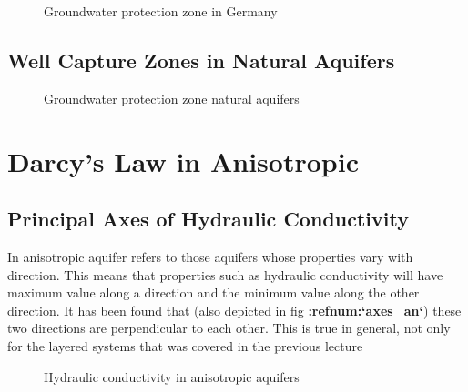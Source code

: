 \documentclass[letterpaper,10pt,english]{jupyterBook}
\begin{document}
\begin{figure}[htbp]
\centering
\capstart

\noindent{}
\caption{Groundwater protection zone in Germany}\label{\detokenize{content/flow/L6/16_darcy_law_3D:pzones-de}}\end{figure}


\subsection{Well Capture Zones in Natural Aquifers}
\label{\detokenize{content/flow/L6/16_darcy_law_3D:well-capture-zones-in-natural-aquifers}}
\begin{figure}[htbp]
\centering
\capstart

\noindent{}
\caption{Groundwater protection zone natural aquifers}\label{\detokenize{content/flow/L6/16_darcy_law_3D:pzones-nat}}\end{figure}


\section{Darcy’s Law in Anisotropic}
\label{\detokenize{content/flow/L6/16_darcy_law_3D:darcy-s-law-in-anisotropic}}

\subsection{Principal Axes of Hydraulic Conductivity}
\label{\detokenize{content/flow/L6/16_darcy_law_3D:principal-axes-of-hydraulic-conductivity}}
\sphinxAtStartPar
In anisotropic aquifer refers to those aquifers whose properties vary with direction. This means that properties such as hydraulic conductivity will have maximum value along a direction and the minimum value along the other direction. It has been found that (also depicted in fig {\color{red}\bfseries{}:refnum:`axes\_an`}) these two directions are perpendicular to each other. This is true in general, not only for the layered systems that was covered in the previous lecture

\begin{figure}[htbp]
\centering
\capstart

\noindent{}
\caption{Hydraulic conductivity in anisotropic aquifers}\label{\detokenize{content/flow/L6/16_darcy_law_3D:axes-an}}\end{figure}
\end{document}
